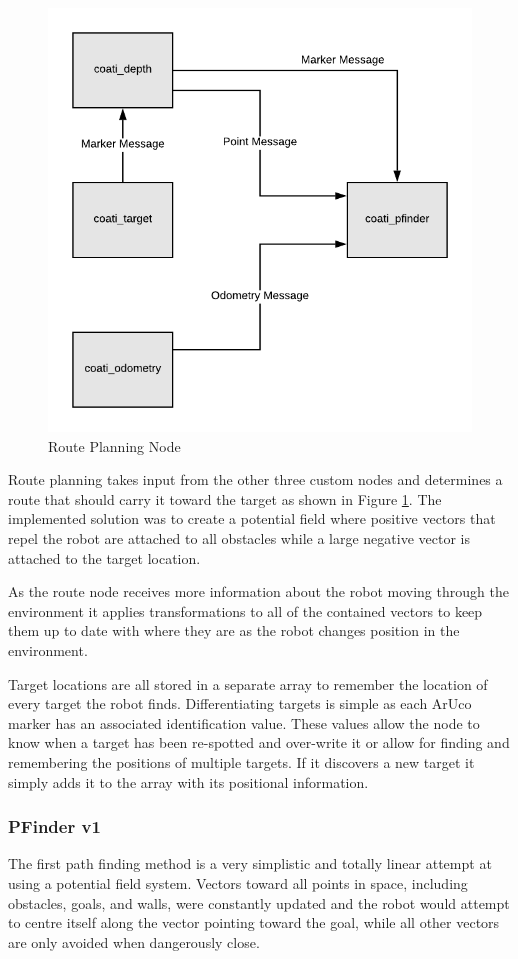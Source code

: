 \documentclass{article}[12]
\begin{document}
	\begin{figure}[H]
		\centering
		\includegraphics[width=0.6\linewidth]{PathFinderDiagram.png}
		\caption{Route Planning Node}
		\label{fig:routeplanning}
	\end{figure}

	Route planning takes input from the other three custom nodes and determines a route that should carry it toward the target as shown in Figure \ref{fig:routeplanning}. The implemented solution was to create a potential field where positive vectors that repel the robot are attached to all obstacles while a large negative vector is attached to the target location.
	
	As the route node receives more information about the robot moving through the environment it applies transformations to all of the contained vectors to keep them up to date with where they are as the robot changes position in the environment. 
	
 Target locations are all stored in a separate array to remember the location of every target the robot finds. Differentiating targets is simple as each ArUco marker has an associated identification value. These values allow the node to know when a target has been re-spotted and over-write it or allow for finding and remembering the positions of multiple targets. If it discovers a new target it simply adds it to the array with its positional information.
 
 	\subsubsection{PFinder v1}
 
 	The first path finding method is a very simplistic and totally linear attempt at using a potential field system. Vectors toward all points in space, including obstacles, goals, and walls, were constantly updated and the robot would attempt to centre itself along the vector pointing toward the goal, while all other vectors are only avoided when dangerously close.
 
\end{document}
